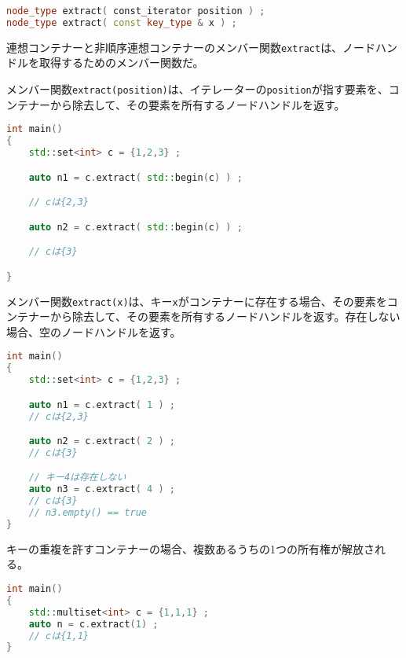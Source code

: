 \bgroup
\begin{lstlisting}[language=C++]
node_type extract( const_iterator position ) ;
node_type extract( const key_type & x ) ;
\end{lstlisting}
\egroup

連想コンテナーと非順序連想コンテナーのメンバー関数\lstinline!extract!は、ノードハンドルを取得するためのメンバー関数だ。

メンバー関数\lstinline!extract(position)!は、イテレーターの\lstinline!position!が指す要素を、コンテナーから除去して、その要素を所有するノードハンドルを返す。

\begin{lstlisting}[language=C++]
int main()
{
    std::set<int> c = {1,2,3} ;

    auto n1 = c.extract( std::begin(c) ) ;

    // cは{2,3}

    auto n2 = c.extract( std::begin(c) ) ;

    // cは{3}

}
\end{lstlisting}

メンバー関数\lstinline!extract(x)!は、キー\lstinline!x!がコンテナーに存在する場合、その要素をコンテナーから除去して、その要素を所有するノードハンドルを返す。存在しない場合、空のノードハンドルを返す。

\begin{lstlisting}[language=C++]
int main()
{
    std::set<int> c = {1,2,3} ;

    auto n1 = c.extract( 1 ) ;
    // cは{2,3}

    auto n2 = c.extract( 2 ) ;
    // cは{3}

    // キー4は存在しない
    auto n3 = c.extract( 4 ) ;
    // cは{3}
    // n3.empty() == true
}
\end{lstlisting}

キーの重複を許すコンテナーの場合、複数あるうちの1つの所有権が解放される。

\begin{lstlisting}[language=C++]
int main()
{
    std::multiset<int> c = {1,1,1} ;
    auto n = c.extract(1) ;
    // cは{1,1}
}
\end{lstlisting}

%


